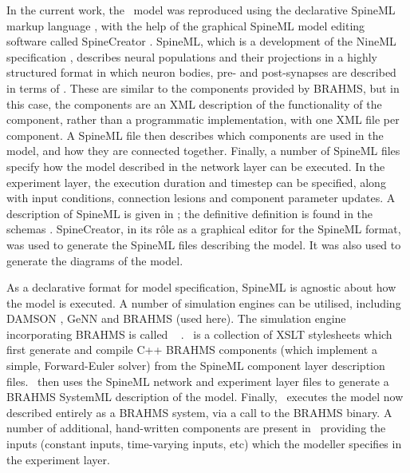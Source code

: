 \documentclass{frontiersSCNS}
\begin{document}
In the current work, the \ccg~model was reproduced using the
declarative SpineML markup
language \citep{alex_cope_spineml_2014,richmond_model_2014}, with the
help of the graphical SpineML model editing software called
SpineCreator
\citep{cope_spinecreator_2015,cope_spinecreator:_2016}. SpineML,
which is a development of the NineML specification
\citep{incf_task_force_on_multi-scale_modeling_network_2011},
describes neural populations and their projections in a highly
structured format in which neuron bodies, pre- and post-synapses are
described in terms of . These are similar to the
components provided by BRAHMS, but in this case, the components are an
XML description of the functionality of the component, rather than a
programmatic implementation, with one XML file per component. A
SpineML  file then describes which components are
used in the model, and how they are connected together. Finally, a
number of SpineML  files specify how the model
described in the network layer can be executed. In the experiment
layer, the execution duration and timestep can be specified, along
with input conditions, connection lesions and component parameter
updates. A description of SpineML is given
in \cite{richmond_model_2014}; the definitive definition is found in
the schemas \citep{cope_spineml_2014}.  SpineCreator, in its r\^ole as
a graphical editor for the SpineML format, was used to generate the
SpineML files describing the model. It was also used to generate the
diagrams of the model.

As a declarative format for model specification, SpineML is agnostic
about how the model is executed. A number of simulation engines can be
utilised, including DAMSON \citep{richmond_damson_2015}, GeNN
\citep{nowotny_flexible_2011,nowotny_spineml_2014} and BRAHMS (used
here). The simulation engine incorporating BRAHMS is called \stob~
\citep{cope_spineml_2_brahms_2015}. \stob~is a collection of XSLT
stylesheets which first generate and compile C++ BRAHMS components
(which implement a simple, Forward-Euler solver) from the SpineML
component layer description files. \stob~then uses the SpineML
network and experiment layer files to generate a BRAHMS SystemML
description of the model. Finally, \stob~executes the model now
described entirely as a BRAHMS system, via a call to the BRAHMS
binary. A number of additional, hand-written components are present
in \stob~providing the inputs (constant inputs, time-varying inputs,
etc) which the modeller specifies in the experiment layer.
\end{document}
